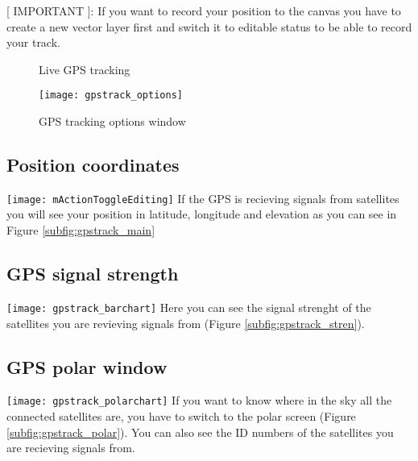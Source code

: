 [ IMPORTANT ]: If you want to record your position to the canvas you have to
create a new vector layer first and switch it to editable status to be able
to record your track.

\begin{figure}[ht]
\centering
     \hspace{0.33cm}
     \hspace{0.33cm}
\caption{Live GPS tracking \nixcaption} \label{fig:gpstrack_live}
\end{figure}

\begin{figure}[ht]
   \centering
   \texttt{[image: gpstrack\_options]}
   \caption{GPS tracking options window \nixcaption}
   \label{fig:gpstrack_options}
\end{figure}

\subsection{Position coordinates}
\texttt{[image: mActionToggleEditing]} If the GPS is
recieving signals from satellites you will see your position in latitude,
longitude and elevation as you can see in Figure \ref{subfig:gpstrack_main}

\subsection{GPS signal strength}
\texttt{[image: gpstrack\_barchart]} Here you can see
the signal strenght of the satellites you are revieving signals from
(Figure \ref{subfig:gpstrack_stren}).

\subsection{GPS polar window}
\texttt{[image: gpstrack\_polarchart]} If you want
to know where in the sky all the connected satellites are, you have to
switch to the polar screen (Figure \ref{subfig:gpstrack_polar}).
You can also see the ID numbers of the satellites you are recieving signals from.


